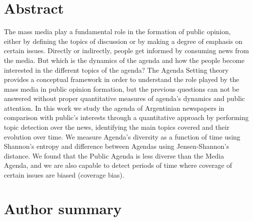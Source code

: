\documentclass[10pt,letterpaper]{article}
\begin{document}
\section*{Abstract}
The mass media play a fundamental role in the formation of public opinion, either by defining the topics of discussion or by making a degree of emphasis on certain issues. Directly or indirectly, people get informed by consuming news from the media. But which is the dynamics of the agenda and how the people become interested in the different topics of the agenda? The Agenda Setting theory provides a conceptual framework in order to understand the role played by the mass media in public opinion formation, but the previous questions can not be answered without proper quantitative measures of agenda's dynamics and public attention. In this work we study the agenda of Argentinian newspapers in comparison with public's interests through a quantitative approach by performing topic detection over the news, identifying the main topics covered and their evolution over time. We measure Agenda's diversity as a function of time using Shannon's entropy and difference between Agendas using Jensen-Shannon's distance. We found that the Public Agenda is less diverse than the Media Agenda, and we are also capable to detect periods of time where coverage of certain issues are biased (coverage bias).\\


\section*{Author summary}


\linenumbers

\end{document}
